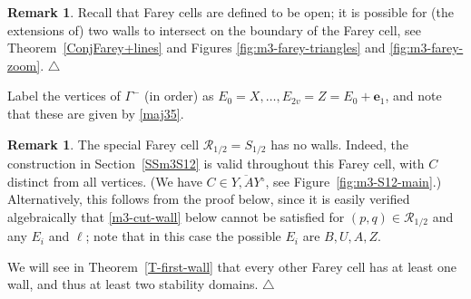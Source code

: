 \documentclass[11pt,reqno,tbtags,a4paper]{amsart}
\numberwithin{equation}{section}
\theoremstyle{plain}%
\theoremstyle{definition}
\newcommand\xqed[1]{%
    \leavevmode\unskip\penalty9999 \hbox{}\nobreak\hfill
    \quad\hbox{#1}}
\newtheorem{remarkqqq}[theorem]{Remark}
\newenvironment{remark}{\begin{remarkqqq}}
  {\xqed{$\triangle$}\end{remarkqqq}}
\theoremstyle{remark}
\newcommand{\refT}[1]{Theorem~\ref{#1}}
\newcommand{\refSS}[1]{Section~\ref{#1}}
\newcommand{\refFig}[1]{Figure~\ref{#1}}
\newcommand\inter{\ensuremath{^\circ}}
\newcommand\gG{\Gamma}
\newcommand\cR{{\mathcal R}}
\newcommand\ve{\mathbf{e}}
\newcommand\linje[1]{\overline{#1}}
\newcommand\0{{\boldsymbol 0}}
\newcommand\1{{\boldsymbol 1}}
\begin{document}
\begin{remark}\label{Rwallsmeet}
Recall that Farey cells are defined to be open;
it is possible for (the extensions of) two walls to intersect on the
boundary of the Farey cell, 
see 
\refT{ConjFarey+lines} and
Figures \ref{fig:m3-farey-triangles} and \ref{fig:m3-farey-zoom}.
\end{remark}

Label the vertices of $\gG^-$ (in order) as
$E_0=X,\dots,E_{2v}=Z=E_0+\ve_1$, and note that
these are given by \eqref{maj35}.

\begin{remark}\label{Rnowall}
 The special Farey cell $\cR_{1/2}=S_{1/2}$ has no walls.
Indeed, the construction in \refSS{SSm3S12} is valid throughout this Farey cell,
with $C$ distinct from all vertices. 
(We have $C\in\linje{Y,AY}\inter$, see \refFig{fig:m3-S12-main}.)
Alternatively, this follows from the proof below, since it is easily verified
algebraically that \eqref{m3-cut-wall} below cannot be satisfied for 
$(p,q)\in\cR_{1/2}$ and any $E_i$ and $\ell$; note that in this case the
possible $E_i$ are $B,U,A,Z$.

We will see in \refT{T-first-wall} that every other Farey cell has at least
one wall, and thus at least two stability domains.
\end{remark}
\end{document}
